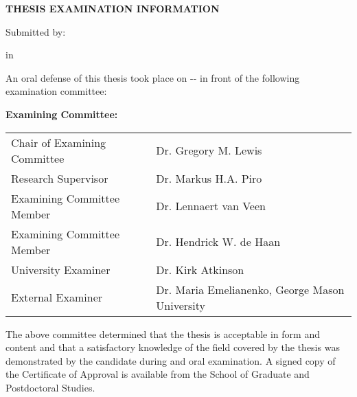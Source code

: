 
\cleardoublepage
\thispagestyle{plain}

\begin{center}
\textbf{THESIS EXAMINATION INFORMATION}

\bigskip

Submitted by:  \makeatletter\textbf{\@firstname\ {\@lastname}}\makeatother

\bigskip
\bigskip

\textbf{\degree} in \textbf{\program}

\end{center}


\bigskip
\bigskip

\noindent {}

\bigskip

\noindent An oral defense of this thesis took place on -\degreemonth-\degreeyear{} in front of the following examination committee:

\medskip

\noindent\textbf{Examining Committee:}

\medskip

\begingroup
\renewcommand{\arraystretch}{1.5}
\begin{tabular}{lcl}
    Chair of Examining Committee &\phantom{abc}& Dr. Gregory  M. Lewis\\
    Research Supervisor && Dr. Markus H.A. Piro\\
    Examining Committee Member && Dr. Lennaert van Veen \\
    Examining Committee Member && Dr. Hendrick W. de Haan \\
    University Examiner && Dr. Kirk Atkinson \\
    External Examiner && Dr. Maria Emelianenko, George Mason University\\
\end{tabular}
\endgroup

\medskip

\noindent The above committee determined that the thesis is acceptable in form and content and that a satisfactory knowledge of the field covered by the thesis was demonstrated by the candidate during and oral examination. A signed copy of the Certificate of Approval is available from the School of Graduate and Postdoctoral Studies.
